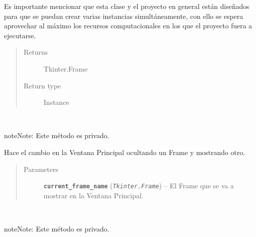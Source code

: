 \documentclass[letterpaper,10pt,english]{sphinxmanual}
\begin{document}
\begin{fulllineitems}
\begin{itemize}
\end{itemize}

\begin{DUlineblock}{0em}
\item[] Es importante mencionar que esta clase y el proyecto en general están diseñados para que 
se puedan crear varias instancias simultáneamente, con ello se espera aprovechar al máximo los recursos
computacionales en los que el proyecto fuera a ejecutarse.
\end{DUlineblock}
\begin{quote}\begin{description}
\item[{Returns}] \leavevmode
Tkinter.Frame

\item[{Return type}] \leavevmode
Instance

\end{description}\end{quote}

\begin{fulllineitems}
\label{View/MainWindow:View.MainWindow.MainWindow._MainWindow__change_frame}~
\begin{notice}{note}{Note:}
Este método es privado.
\end{notice}

Hace el cambio en la Ventana Principal ocultando un Frame y
mostrando otro.
\begin{quote}\begin{description}
\item[{Parameters}] \leavevmode
\textbf{\texttt{current\_frame\_name}} (\emph{\texttt{Tkinter.Frame}}) -- El Frame que se va a mostrar en 
la Ventana Principal.

\end{description}\end{quote}

\end{fulllineitems}


\begin{fulllineitems}
\label{View/MainWindow:View.MainWindow.MainWindow._MainWindow__check_queues}~
\begin{notice}{note}{Note:}
Este método es privado.
\end{notice}


\end{fulllineitems}
\end{fulllineitems}
\end{document}
